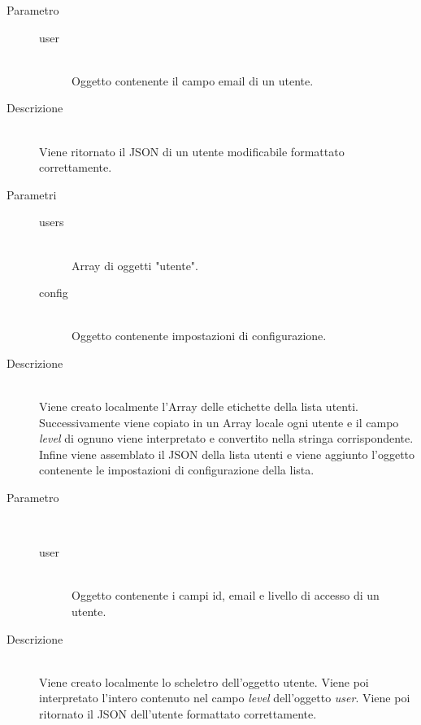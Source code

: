 \begin{description}
\begin{mldescription}
    \hfill
   \begin{description}
    \item[Parametro] \hfill
     \begin{description}
      \item[user] \hfill \\
      Oggetto contenente il campo email di un utente.
     \end{description}
    \item[Descrizione] \hfill \\
    Viene ritornato il JSON di un utente modificabile formattato correttamente.
   \end{description}
   
    \hfill
   \begin{description}
    \item[Parametri]
     \begin{description}
      \item[users] \hfill \\
      Array di oggetti "utente".
      \item[config] \hfill \\
      Oggetto contenente impostazioni di configurazione.
     \end{description}
    \item[Descrizione] \hfill \\
    Viene creato localmente l'Array delle etichette della lista utenti. Successivamente viene copiato in un Array locale ogni utente e il campo \textit{level} di ognuno viene interpretato e convertito nella stringa corrispondente. Infine viene assemblato il JSON della lista utenti e viene aggiunto l'oggetto contenente le impostazioni di configurazione della lista.
   \end{description}
   
    \hfill
   \begin{description}
    \item[Parametro] \hfill \\
     \begin{description}
      \item[user] \hfill \\
      Oggetto contenente i campi id, email e livello di accesso di un utente.
     \end{description}
    \item[Descrizione] \hfill \\
    Viene creato localmente lo scheletro dell'oggetto utente. Viene poi interpretato l'intero contenuto nel campo \textit{level} dell'oggetto \textit{user}. Viene poi ritornato il JSON dell'utente formattato correttamente.
   \end{description}
   
 \end{mldescription}
 
\end{description}

